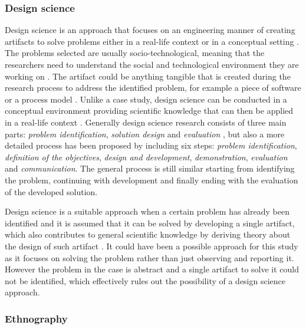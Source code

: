 \subsubsection*{Design science}

Design science is an approach that focuses on an engineering manner of creating artifacts to solve problems either in a real-life context or in a conceptual setting
\citep{Offermann2009}. The problems selected are
usually socio-technological, meaning that the researchers need to understand the social and technological environment they are working on \citep{Baskerville2009}.
The artifact could be anything tangible that is created during the research process to address the identified problem, for example a piece of software or a process model
\citep{Peffers2007}. Unlike a case study, design science can be conducted in a conceptual environment providing scientific knowledge that can then be applied
in a real-life context \citep{Offermann2009}. Generally design science research consists of three main
parts: \emph{problem identification}, \emph{solution design} and \emph{evaluation} \citep{Offermann2009}, but also a more detailed process has been proposed by
\citet{Peffers2007} including six steps: \emph{problem identification}, \emph{definition of the objectives}, \emph{design and development}, \emph{demonstration},
\emph{evaluation} and \emph{communication}. The general process is still similar starting from identifying the problem, continuing with development and finally ending with
the evaluation of the developed solution.

Design science is a suitable approach when a certain problem has already been identified and it is assumed that it can be solved
by developing a single artifact, which also contributes to general scientific knowledge by deriving theory about the design of such artifact \citep{Offermann2009}.
It could have been a possible approach for this study as it focuses on solving the problem rather than just observing and reporting it. However the problem
in the case is abstract and a single artifact to solve it could not be identified, which effectively rules out the possibility of a design science approach.

\subsubsection*{Ethnography}


